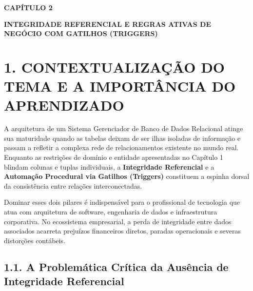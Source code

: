 
\begin{center}
\textbf{\fontsize{14}{16}\selectfont CAPÍTULO 2}

\vspace{0.5em}

\textbf{\fontsize{14}{16}\selectfont INTEGRIDADE REFERENCIAL E REGRAS ATIVAS DE NEGÓCIO COM GATILHOS (TRIGGERS)}
\end{center}

\vspace{1.5em}

\section*{1. CONTEXTUALIZAÇÃO DO TEMA E A IMPORTÂNCIA DO APRENDIZADO}

A arquitetura de um Sistema Gerenciador de Banco de Dados Relacional atinge sua maturidade quando as tabelas deixam de ser ilhas isoladas de informação e passam a refletir a complexa rede de relacionamentos existente no mundo real. Enquanto as restrições de domínio e entidade apresentadas no Capítulo 1 blindam colunas e tuplas individuais, a \textbf{Integridade Referencial} e a \textbf{Automação Procedural via Gatilhos (Triggers)} constituem a espinha dorsal da consistência entre relações interconectadas.

Dominar esses dois pilares é indispensável para o profissional de tecnologia que atua com arquitetura de software, engenharia de dados e infraestrutura corporativa. No ecossistema empresarial, a perda de integridade entre dados associados acarreta prejuízos financeiros diretos, paradas operacionais e severas distorções contábeis.

\subsection*{1.1. A Problemática Crítica da Ausência de Integridade Referencial}


